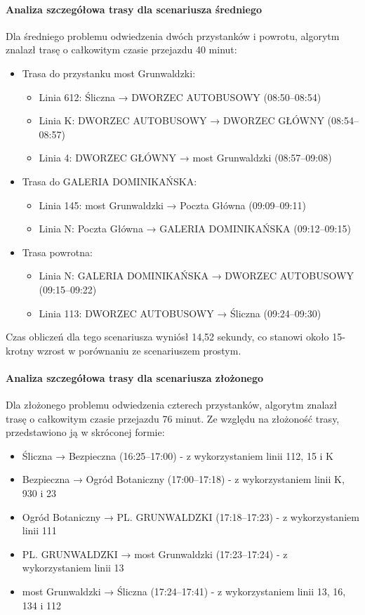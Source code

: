 \documentclass[12pt,a4paper]{article}
\begin{document}
\paragraph{Analiza szczegółowa trasy dla scenariusza średniego}
Dla średniego problemu odwiedzenia dwóch przystanków i powrotu, algorytm znalazł trasę o całkowitym czasie przejazdu 40 minut:

\begin{itemize}
    \item Trasa do przystanku most Grunwaldzki:
    \begin{itemize}
        \item Linia 612: Śliczna → DWORZEC AUTOBUSOWY (08:50--08:54)
        \item Linia K: DWORZEC AUTOBUSOWY → DWORZEC GŁÓWNY (08:54--08:57)
        \item Linia 4: DWORZEC GŁÓWNY → most Grunwaldzki (08:57--09:08)
    \end{itemize}
    \item Trasa do GALERIA DOMINIKAŃSKA:
    \begin{itemize}
        \item Linia 145: most Grunwaldzki → Poczta Główna (09:09--09:11)
        \item Linia N: Poczta Główna → GALERIA DOMINIKAŃSKA (09:12--09:15)
    \end{itemize}
    \item Trasa powrotna:
    \begin{itemize}
        \item Linia N: GALERIA DOMINIKAŃSKA → DWORZEC AUTOBUSOWY (09:15--09:22)
        \item Linia 113: DWORZEC AUTOBUSOWY → Śliczna (09:24--09:30)
    \end{itemize}
\end{itemize}

Czas obliczeń dla tego scenariusza wyniósł 14,52 sekundy, co stanowi około 15-krotny wzrost w porównaniu ze scenariuszem prostym.

\paragraph{Analiza szczegółowa trasy dla scenariusza złożonego}
Dla złożonego problemu odwiedzenia czterech przystanków, algorytm znalazł trasę o całkowitym czasie przejazdu 76 minut. Ze względu na złożoność trasy, przedstawiono ją w skróconej formie:

\begin{itemize}
    \item Śliczna → Bezpieczna (16:25--17:00) - z wykorzystaniem linii 112, 15 i K
    \item Bezpieczna → Ogród Botaniczny (17:00--17:18) - z wykorzystaniem linii K, 930 i 23 
    \item Ogród Botaniczny → PL. GRUNWALDZKI (17:18--17:23) - z wykorzystaniem linii 111
    \item PL. GRUNWALDZKI → most Grunwaldzki (17:23--17:24) - z wykorzystaniem linii 13
    \item most Grunwaldzki → Śliczna (17:24--17:41) - z wykorzystaniem linii 13, 16, 134 i 112
\end{itemize}
\end{document}
